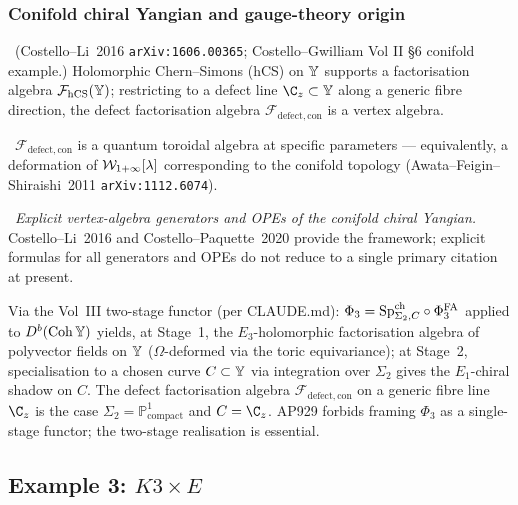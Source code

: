 \subsubsection{Conifold chiral Yangian and gauge-theory origin}
\label{w17:subsubsec:conifold-chiral}

\begin{remark}
\label{w17:rem:hcs-on-conifold}
\ClaimStatusConjectured\ (Costello--Li~2016 \texttt{arXiv:1606.00365};
Costello--Gwilliam Vol II \S6 conifold example.) Holomorphic Chern--Simons
(hCS) on $\mathbb{Y}$ supports a factorisation algebra
$\mathcal{F}_{\mathrm{hCS}}(\mathbb{Y})$; restricting to a defect line $\C_z \subset \bY$
along a generic fibre direction, the defect factorisation algebra
$\mathcal{F}_{\mathrm{defect, con}}$ is a vertex algebra.

\ClaimStatusConjectured\ $\mathcal{F}_{\mathrm{defect, con}}$ is a quantum toroidal
algebra at specific parameters --- equivalently, a deformation of
$\mathcal{W}_{1+\infty}[\lambda]$ corresponding to the conifold topology
(Awata--Feigin--Shiraishi~2011 \texttt{arXiv:1112.6074}).

\ClaimStatusOpen\ \emph{Explicit vertex-algebra generators and OPEs of the
conifold chiral Yangian.} Costello--Li~2016 and Costello--Paquette~2020 provide
the framework; explicit formulas for all generators and OPEs do not reduce to
a single primary citation at present.
\end{remark}

\begin{remark}
\label{w17:rem:phi3-conifold}
Via the Vol~III two-stage functor (per CLAUDE.md):
$\Phi_3 = \mathrm{Sp}^{\mathrm{ch}}_{\Sigma_2, C} \circ \Phi^{\mathrm{FA}}_3$ applied to
$D^b(\mathrm{Coh}\,\mathbb{Y})$ yields, at Stage~1, the $E_3$-holomorphic factorisation
algebra of polyvector fields on $\mathbb{Y}$ ($\Omega$-deformed via the toric
equivariance); at Stage~2, specialisation to a chosen curve $C \subset \mathbb{Y}$
via integration over $\Sigma_2$ gives the $E_1$-chiral shadow on $C$. The
defect factorisation algebra $\mathcal{F}_{\mathrm{defect, con}}$ on a generic
fibre line $\C_z$ is the case $\Sigma_2 = \mathbb{P}^1_{\mathrm{compact}}$
and $C = \C_z$. AP929 forbids framing $\Phi_3$ as a single-stage functor;
the two-stage realisation is essential.
\end{remark}

\subsection{Example 3: $K3 \times E$}
\label{w17:subsec:k3-times-e}

